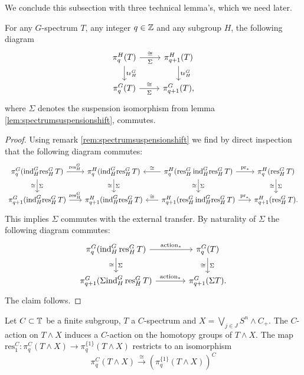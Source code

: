 We conclude this subsection
with three technical lemma's, which we need later.
\begin{lem}\label{lem:suspensiontransfer}
For any $G$-spectrum $T$, any integer $q\in \mathbb{Z}$  and any subgroup $H$, the following diagram
\[
\begin{tikzcd}
\pi_q^H(T)
\arrow{r}{\cong}[swap]{\Sigma}\arrow{d}{\mathrm{tr}^G_H}
&\pi_{q+1}^H(T)
\arrow{d}{\mathrm{tr}^G_H}\\
\pi_q^G(T)
\arrow{r}{\cong}[swap]{\Sigma}
&\pi_{q+1}^G(T),
\end{tikzcd}
\]
where $\Sigma$ denotes the suspension isomorphism from lemma
\ref{lem:spectrumsuspensionshift}, commutes.
\end{lem}
\begin{proof}
Using remark \ref{rem:spectrumsuspensionshift} we find by
direct inspection that the following diagram commutes:
\[
\begin{tikzcd}[column sep = 1.7em]
\pi_q^G(\mathrm{ind}^G_H \mathrm{res}^G_H\, T)
\arrow{r}{\mathrm{res}^G_H\,} \arrow{d}[swap]{\cong}{\Sigma}
&\pi_q^H(\mathrm{ind}^G_H \mathrm{res}^G_H\, T)
\arrow{d}[swap]{\cong}{\Sigma}
&\pi_q^H(\mathrm{res}^G_H\, \mathrm{ind}^G_H \mathrm{res}^G_H\, T)
\arrow{r}{\mathrm{pr}_\ast}\arrow{l}[swap]{\cong}
\arrow{d}[swap]{\cong}{\Sigma}
&\pi_q^H(\mathrm{res}^G_H\, T)
\arrow{d}[swap]{\cong}{\Sigma}\\
\pi_{q+1}^G(\mathrm{ind}^G_H \mathrm{res}^G_H\, T)
\arrow{r}{\mathrm{res}^G_H\,} 
&\pi_{q+1}^H(\mathrm{ind}^G_H \mathrm{res}^G_H\, T)
&\pi_{q+1}^H(\mathrm{res}^G_H\, \mathrm{ind}^G_H \mathrm{res}^G_H\, T)
\arrow{r}{\mathrm{pr}_\ast}\arrow{l}[swap]{\cong}
&\pi_{q+1}^H(\mathrm{res}^G_H\, T).
\end{tikzcd}
\]
This implies $\Sigma$ commutes with the external transfer. By naturality
of $\Sigma$
the following diagram commutes:
\[
\begin{tikzcd}[column sep = large]
\pi_q^G(\mathrm{ind}^G_H\,\mathrm{res}^G_H\, T)
\arrow{r}{\mathrm{action}_\ast} \arrow{d}[swap]{\cong}{\Sigma}
&\pi_q^G(T)
\arrow{d}[swap]{\cong}{\Sigma}\\
\pi_{q+1}^G(\Sigma\mathrm{ind}^G_H\,\mathrm{res}^G_H\, T)
\arrow{r}{\mathrm{action}_\ast}
&\pi_{q+1}^G(\Sigma T).
\end{tikzcd}
\]
The claim follows.
\end{proof}
\begin{lem}\label{lem:switchfixedpoints}
Let $C\subset \mathbb{T}$ be a finite subgroup, $T$ a $C$-spectrum
and $X = \bigvee_{j\in J} S^n\wedge C_+$.
The $C$-action on $ T\wedge X$ induces
a $C$-action on the homotopy groups of $T\wedge X$.
The map $\mathrm{res}^C_1:\pi_q^C( T\wedge X)\to 
\pi_q^{\{1\}}(T\wedge X)$ restricts to an isomorphism
\[\pi_q^C( T\wedge X)\xrightarrow{\cong} 
\left(\pi_q^{\{1\}}(  T\wedge X)\right)^C\]
\end{lem}

